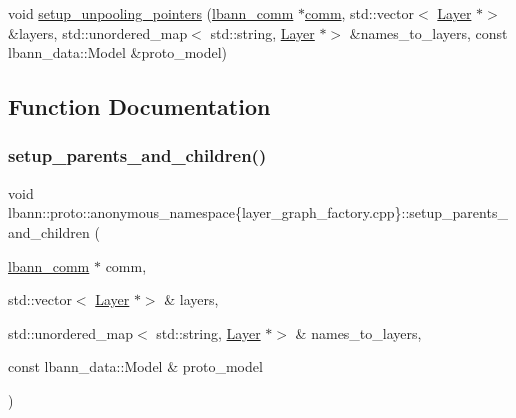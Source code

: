 \begin{DoxyCompactItemize}
\item 
void \hyperlink{namespacelbann_1_1proto_1_1anonymous__namespace_02layer__graph__factory_8cpp_03_a68f963a80592c01832cacf2acd4bacc1}{setup\+\_\+unpooling\+\_\+pointers} (\hyperlink{classlbann_1_1lbann__comm}{lbann\+\_\+comm} $\ast$\hyperlink{file__io_8cpp_ab048c6f9fcbcfaa57ce68b00263dbebe}{comm}, std\+::vector$<$ \hyperlink{classlbann_1_1Layer}{Layer} $\ast$$>$ \&layers, std\+::unordered\+\_\+map$<$ std\+::string, \hyperlink{classlbann_1_1Layer}{Layer} $\ast$$>$ \&names\+\_\+to\+\_\+layers, const lbann\+\_\+data\+::\+Model \&proto\+\_\+model)
\end{DoxyCompactItemize}


\subsection{Function Documentation}
\mbox{\label{namespacelbann_1_1proto_1_1anonymous__namespace_02layer__graph__factory_8cpp_03_abbebb0b2e6ba1befb14b0b790eac96a0}} 
\subsubsection{\texorpdfstring{setup\+\_\+parents\+\_\+and\+\_\+children()}{setup\_parents\_and\_children()}}
{\footnotesize\ttfamily void lbann\+::proto\+::anonymous\+\_\+namespace\{layer\+\_\+graph\+\_\+factory.\+cpp\}\+::setup\+\_\+parents\+\_\+and\+\_\+children (\begin{DoxyParamCaption}\item[{\hyperlink{classlbann_1_1lbann__comm}{lbann\+\_\+comm} $\ast$}]{comm,  }\item[{std\+::vector$<$ \hyperlink{classlbann_1_1Layer}{Layer} $\ast$$>$ \&}]{layers,  }\item[{std\+::unordered\+\_\+map$<$ std\+::string, \hyperlink{classlbann_1_1Layer}{Layer} $\ast$$>$ \&}]{names\+\_\+to\+\_\+layers,  }\item[{const lbann\+\_\+data\+::\+Model \&}]{proto\+\_\+model }\end{DoxyParamCaption})}

